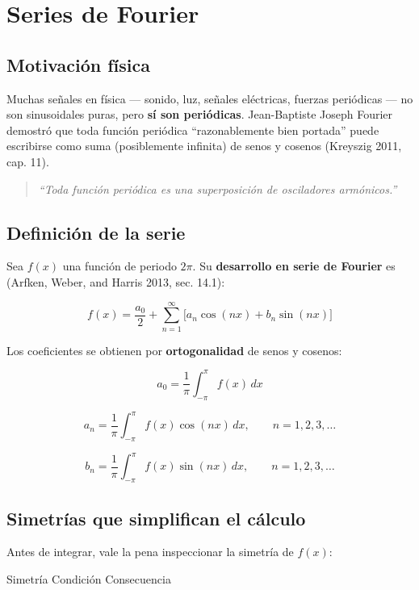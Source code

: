 \documentclass[
  letterpaper,
  DIV=11,
  numbers=noendperiod]{scrreprt}
\begin{document}
\chapter{Series de Fourier}\label{sec-fourier}

\section{Motivación física}\label{motivaciuxf3n-fuxedsica}

Muchas señales en física --- sonido, luz, señales eléctricas, fuerzas
periódicas --- no son sinusoidales puras, pero \textbf{sí son
periódicas}. Jean-Baptiste Joseph Fourier demostró que toda función
periódica ``razonablemente bien portada'' puede escribirse como suma
(posiblemente infinita) de senos y cosenos (Kreyszig 2011, cap. 11).

\begin{quote}
\emph{``Toda función periódica es una superposición de osciladores
armónicos.''}
\end{quote}

\section{Definición de la serie}\label{definiciuxf3n-de-la-serie}

Sea \(f(x)\) una función de periodo \(2\pi\). Su \textbf{desarrollo en
serie de Fourier} es (Arfken, Weber, and Harris 2013, sec. 14.1):

\[
f(x) = \frac{a_0}{2} + \sum_{n=1}^{\infty}\bigl[a_n\cos(nx) + b_n\sin(nx)\bigr]
\]

Los coeficientes se obtienen por \textbf{ortogonalidad} de senos y
cosenos:

\[
a_0 = \frac{1}{\pi}\int_{-\pi}^{\pi} f(x)\,dx
\]

\[
a_n = \frac{1}{\pi}\int_{-\pi}^{\pi} f(x)\cos(nx)\,dx, \qquad n = 1,2,3,\ldots
\]

\[
b_n = \frac{1}{\pi}\int_{-\pi}^{\pi} f(x)\sin(nx)\,dx, \qquad n = 1,2,3,\ldots
\]

\section{Simetrías que simplifican el
cálculo}\label{simetruxedas-que-simplifican-el-cuxe1lculo}

Antes de integrar, vale la pena inspeccionar la simetría de \(f(x)\):

Simetría \textbar{} Condición \textbar{} Consecuencia \textbar{}
\end{document}
